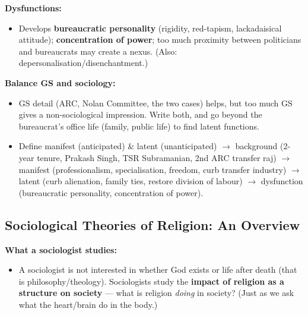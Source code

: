 \begin{ExampleBox}
\textbf{Dysfunctions:}
\begin{itemize}
\item Develops \textbf{bureaucratic personality} (rigidity, red-tapism, lackadaisical attitude); \textbf{concentration of power}; too much proximity between politicians and bureaucrats may create a nexus. (Also: depersonalisation/disenchantment.)
\end{itemize}
\end{ExampleBox}

\begin{CriticalPoint}
\textbf{Balance GS and sociology:}
\begin{itemize}
\item GS detail (ARC, Nolan Committee, the two cases) helps, but too much GS gives a non-sociological impression. Write both, and go beyond the bureaucrat's office life (family, public life) to find latent functions.
\end{itemize}
\end{CriticalPoint}

\begin{QuickRevision}
\begin{itemize}
\item Define manifest (anticipated) \& latent (unanticipated) $\rightarrow$ background (2-year tenure, Prakash Singh, TSR Subramanian, 2nd ARC transfer raj) $\rightarrow$ manifest (professionalism, specialisation, freedom, curb transfer industry) $\rightarrow$ latent (curb alienation, family ties, restore division of labour) $\rightarrow$ dysfunction (bureaucratic personality, concentration of power).
\end{itemize}
\end{QuickRevision}

\sectiondivider

\subsection{Sociological Theories of Religion: An Overview}

\begin{KeyConcept}
\textbf{What a sociologist studies:}
\begin{itemize}
\item A sociologist is not interested in whether God exists or life after death (that is philosophy/theology). Sociologists study the \textbf{impact of religion as a structure on society} --- what is religion \textit{doing} in society? (Just as we ask what the heart/brain do in the body.)
\end{itemize}
\end{KeyConcept}

